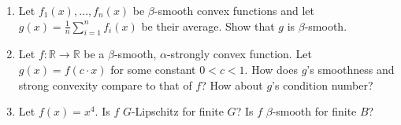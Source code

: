 \documentclass[10pt]{article}
\newcommand{\bv}[1]{\mathbf{#1}}
\newcommand{\R}{\mathbb{R}}
\begin{document}
\begin{enumerate}
	\item Let $f_1(x), \ldots, f_n(x)$ be $\beta$-smooth convex functions and let $g(x) = \frac{1}{n}\sum_{i=1}^n f_i(x)$ be their average. Show that $g$ is $\beta$-smooth.
	\item Let $f: \R\rightarrow \R$ be a $\beta$-smooth, $\alpha$-strongly  convex function. Let $g(x) = f(c\cdot x)$ for some constant $0< c < 1$.  How does $g$'s smoothness and strong convexity compare to that of $f$? How about $g$'s condition number?
	\item Let $f(x) = x^4$. Is $f$ $G$-Lipschitz for finite $G$?  Is $f$ $\beta$-smooth for finite $B$? 
\end{enumerate}
\end{document}
